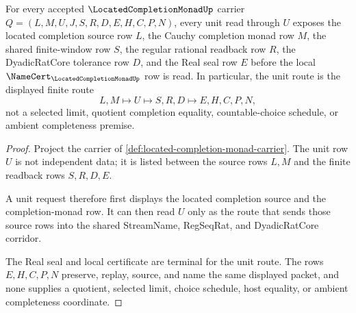 \begin{theorem}
\label{thm:located-completion-monad-unit-exactness}
For every accepted $\LocatedCompletionMonadUp$ carrier
$Q=(L,M,U,J,S,R,D,E,H,C,P,N)$, every unit read through $U$ exposes the located
completion source row $L$, the Cauchy completion monad row $M$, the shared
finite-window row $S$, the regular rational readback row $R$, the DyadicRatCore
tolerance row $D$, and the Real seal row $E$ before the local
$\NameCert_{\LocatedCompletionMonadUp}$ row is read. In particular, the unit
route is the displayed finite route
$$
L,M \longmapsto U \longmapsto S,R,D \longmapsto E,H,C,P,N ,
$$
not a selected limit, quotient completion equality, countable-choice schedule,
or ambient completeness premise.
\end{theorem}
\begin{proof}
Project the carrier of \autoref{def:located-completion-monad-carrier}. The
unit row $U$ is not independent data; it is listed between the source rows
$L,M$ and the finite readback rows $S,R,D,E$.

A unit request therefore first displays the located completion source and the
completion-monad row. It can then read $U$ only as the route that sends those
source rows into the shared StreamName, RegSeqRat, and DyadicRatCore corridor.

The Real seal and local certificate are terminal for the unit route. The rows
$E,H,C,P,N$ preserve, replay, source, and name the same displayed packet, and
none supplies a quotient, selected limit, choice schedule, host equality, or
ambient completeness coordinate.
\end{proof}

